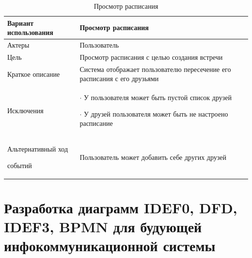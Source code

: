 \documentclass[14pt]{extreport}
\begin{document}
        
            \begin{table}[H]
        
                \begin{center}
                \caption{Просмотр расписания \label{table2}}
                \begin{tabular}{|p{5.5cm}|p{10.7cm}|}
                \hline
                Вариант использования & Просмотр расписания \\
                \hline
                Актеры
                 & Пользователь
                 \\
                \hline
                Цель
                 & Просмотр расписания с целью создания встречи 
                 \\
                \hline
                Краткое описание
                 & Система отображает пользователю пересечение его расписания с его друзьями 
                 \\
                \hline
                Исключения
                 & 
                $\cdot$ У пользователя может быть пустой список друзей 
                
                $\cdot$ У друзей пользователя может быть не настроено расписание 
                 \\
                \hline
                Альтернативный ход 
                
                событий
                & Пользователь может добавить себе других друзей \\
                
                \hline
                \end{tabular}
                \end{center}
                \end{table}
            


\newpage 


\section{Разработка диаграмм IDEF0, DFD, IDEF3, BPMN для будующей инфокоммуникационной системы}
\end{document}
